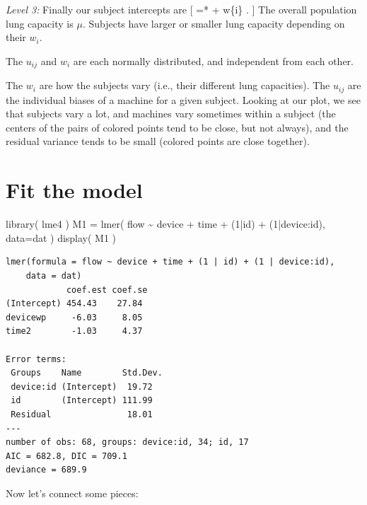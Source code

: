 \documentclass[
  letterpaper,
  DIV=11,
  numbers=noendperiod]{scrreprt}
\newenvironment{Shaded}{\begin{snugshade}}{\end{snugshade}}
\newcommand{\AttributeTok}[1]{\textcolor[rgb]{0.49,0.56,0.16}{#1}}
\newcommand{\DecValTok}[1]{\textcolor[rgb]{0.25,0.63,0.44}{#1}}
\newcommand{\FunctionTok}[1]{\textcolor[rgb]{0.02,0.16,0.49}{#1}}
\newcommand{\NormalTok}[1]{\textcolor[rgb]{0.00,0.44,0.13}{#1}}
\newcommand{\OtherTok}[1]{\textcolor[rgb]{0.00,0.44,0.13}{#1}}
\newcommand{\SpecialCharTok}[1]{\textcolor[rgb]{0.25,0.44,0.63}{#1}}
\begin{document}
\emph{Level 3:} Finally our subject intercepts are {[}  =*
\mu + w\{i\} . {]} The overall population lung capacity is \(\mu\).
Subjects have larger or smaller lung capacity depending on their
\(w_{i}\).

The \(u_{ij}\) and \(w_i\) are each normally distributed, and
independent from each other.

The \(w_i\) are how the subjects vary (i.e., their different lung
capacities). The \(u_{ij}\) are the individual biases of a machine for a
given subject. Looking at our plot, we see that subjects vary a lot, and
machines vary sometimes within a subject (the centers of the pairs of
colored points tend to be close, but not always), and the residual
variance tends to be small (colored points are close together).

\hypertarget{fit-the-model}{%
\section{Fit the model}\label{fit-the-model}}

\begin{Shaded}
\begin{Highlighting}[]
\FunctionTok{library}\NormalTok{( lme4 )}
\NormalTok{M1 }\OtherTok{=} \FunctionTok{lmer}\NormalTok{( flow }\SpecialCharTok{\textasciitilde{}}\NormalTok{ device }\SpecialCharTok{+}\NormalTok{ time }\SpecialCharTok{+}\NormalTok{ (}\DecValTok{1}\SpecialCharTok{|}\NormalTok{id) }\SpecialCharTok{+}\NormalTok{ (}\DecValTok{1}\SpecialCharTok{|}\NormalTok{device}\SpecialCharTok{:}\NormalTok{id), }\AttributeTok{data=}\NormalTok{dat )}
\FunctionTok{display}\NormalTok{( M1 )}
\end{Highlighting}
\end{Shaded}

\begin{verbatim}
lmer(formula = flow ~ device + time + (1 | id) + (1 | device:id), 
    data = dat)
            coef.est coef.se
(Intercept) 454.43    27.84 
devicewp     -6.03     8.05 
time2        -1.03     4.37 

Error terms:
 Groups    Name        Std.Dev.
 device:id (Intercept)  19.72  
 id        (Intercept) 111.99  
 Residual               18.01  
---
number of obs: 68, groups: device:id, 34; id, 17
AIC = 682.8, DIC = 709.1
deviance = 689.9 
\end{verbatim}

Now let's connect some pieces:
\end{document}
